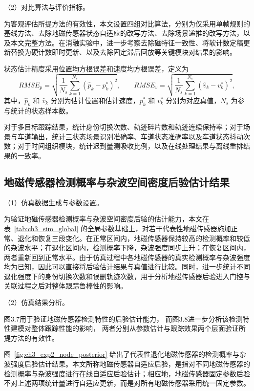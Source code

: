 \documentclass{xdupgthesis}
\begin{document}
\noindent （2）对比算法与评价指标。

为客观评估所提方法的有效性，本文设置四组对比算法，分别为仅采用单帧规则的基线方法、去除地磁传感器状态自适应的改写方法、去除场景递推的改写方法，以及本文完整方法。在消融实验中，进一步考察去除磁特征一致性、将软计数定稿更新替换为硬计数即时更新、以及去除固定滞后回放等关键模块对结果的影响。

状态估计精度采用位置均方根误差和速度均方根误差，定义为
\begin{equation}
	RMSE_p=
	\sqrt{\frac{1}{N_s}\sum_{k=1}^{N_s}(\hat p_k-p_k^{\ast})^2},
	\qquad
	RMSE_v=
	\sqrt{\frac{1}{N_s}\sum_{k=1}^{N_s}(\hat v_k-v_k^{\ast})^2},
	\label{eq:ch3_rmse_exp}
\end{equation}
其中，$\hat p_k$ 和 $\hat v_k$ 分别为估计位置和估计速度，$p_k^{\ast}$ 和 $v_k^{\ast}$ 分别为对应真值，$N_s$ 为参与统计的状态样本数。

对于多目标跟踪结果，统计身份切换次数、轨迹碎片数和轨迹连续保持率；对于场景与车道输出，统计三状态场景识别准确率、车道状态准确率以及车道状态抖动次数；对于时间组织模块，统计迟到量测吸收比例，以及在线处理结果与离线重排结果的一致率。

\subsection{地磁传感器检测概率与杂波空间密度后验估计结果}

\noindent （1）仿真数据生成与参数设置。

为验证地磁传感器检测概率与杂波空间密度后验的估计能力，本文在表~\ref{tab:ch3_sim_global} 的全局参数基础上，对若干代表性地磁传感器施加正常、退化和恢复三段变化。在正常区间内，地磁传感器保持较高的检测概率和较低的杂波水平；在退化区间内，检测概率下降，杂波强度同步上升；在恢复区间内，两者重新回到正常水平。由于仿真过程中各地磁传感器的真实检测概率与杂波强度均为已知，因此可以直接将后验估计结果与真值进行比较。同时，进一步统计不同退化强度下的身份切换次数和误删轨迹次数，用于分析地磁传感器后验进入门控与关联过程之后对整体跟踪鲁棒性的影响。

\noindent （2）仿真结果分析。

图3.7用于验证地磁传感器检测特性的后验估计能力，
而图3.8进一步分析该检测特性建模对整体跟踪性能的影响，
两者分别从参数估计与跟踪效果两个层面验证所提方法的有效性。

图~\ref{fig:ch3_exp2_node_posterior} 给出了代表性退化地磁传感器的检测概率与杂波强度后验估计结果。本文所称地磁传感器自适应后验，是指对不同地磁传感器的检测概率与杂波强度进行在线自适应后验估计；相应地，地磁传感器固定参数后验不对上述两项统计量进行自适应更新，而是对所有地磁传感器采用统一固定参数。
\end{document}
